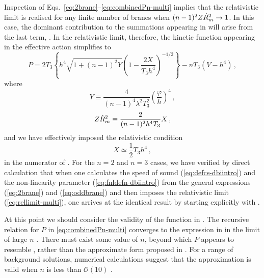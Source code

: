 Inspection of Eqs.~\eqref{eq:2brane}--\eqref{eq:combinedPn-multi} implies that 
the relativistic limit is realised for any finite number of branes when 
$(n-1)^2 Z\dot{R}_m^2 \rightarrow 1$. In this case, the dominant contribution 
to the summations appearing in 
will arise from the last term, . In the relativistic limit, 
therefore, the kinetic function appearing in the effective action simplifies to 
% 
\begin{equation}
\label{eq:unifiedP-multi}
P = 2T_3 \left\{ h^4 \sqrt{1+(n-1)^2Y} 
\left( 1- \frac{2X}{T_3h^4} \right)^{-1/2} 
 \right\} - n T_3 \left(V - h^4 \right) \,,
\end{equation}
% 
where 
% 
\begin{equation}
\label{eq:defY-multi}
Y \equiv \frac{4}{(n-1)^4 \lambda^2 T_3^2} \left( \frac{\varphi}{h} \right)^4 \,,
\end{equation}
% 
\begin{equation}
\label{eq:defXR2-multi}
Z\dot{R}_m^2 \equiv \frac{2}{(n-1)^2 h^4 T_3}X \,,
\end{equation} 
% 
and we have effectively imposed the relativistic condition 
% 
\begin{equation}
\label{eq:rellimit-multi}
X \simeq \frac{1}{2} T_3 h^4 \,,
\end{equation}
% 
in the numerator of .  
For the $n=2$ and $n=3$ cases, we have verified by direct 
calculation that when one calculates the speed of sound 
(\ref{eq:defcs-dbiintro}) and the non-linearity parameter 
(\ref{eq:fnldefn-dbiintro}) from the general expressions (\ref{eq:2brane}) and (\ref{eq:oddbrane}) 
and then imposes the relativistic
limit (\ref{eq:rellimit-multi}), one arrives at the identical result 
by starting explicitly with .


At this point we should consider the validity of 
the function in . 
The recursive relation for $P$ in \eqref{eq:combinedPn-multi} converges to the
expression in  in the limit of large $n$
\cite{Berndsen:2009ww}. 
There must exist some 
value of $n$, beyond which $P$ appears to resemble ,
rather than the 
approximate form proposed in . 
For a range of background 
solutions, numerical calculations suggest that the approximation is valid
when $n$ is less than $\mathcal{O}(10)$ \cite{hltw}. 

